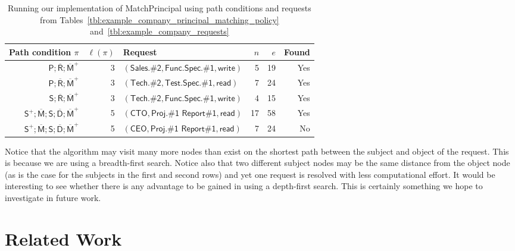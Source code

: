 \documentclass{article}
\newcommand{\comp}{\mathbin{;}}
\begin{document}
\begin{table*}[!ht]\centering
  {\renewcommand{\arraystretch}{1.25}
  \begin{tabular}{|r|r|l|r|r|r|}
    \hline
        \bf Path condition $\pi$ & $\ell(\pi)$ & \bf Request & $n$ & $e$ & \bf Found\\
    \hline
    \hline
        $\textsf{P} \comp \overline{\textsf{R}} \comp \overline{\textsf{M}}^+$ & 3 & $(\textsf{Sales.\#2}, \textsf{Func.Spec.\#1}, \textsf{write})$ & 5 & 19 & Yes\\
        $\textsf{P} \comp \overline{\textsf{R}} \comp \overline{\textsf{M}}^+$ & 3 & $(\textsf{Tech.\#2}, \textsf{Test.Spec.\#1}, \textsf{read})$ & 7 & 24 & Yes\\
        $\textsf{S} \comp \overline{\textsf{R}} \comp \overline{\textsf{M}}^+$  & 3 & $(\textsf{Tech.\#2}, \textsf{Func.Spec.\#1}, \textsf{write})$ & 4 & 15 & Yes\\
        $\textsf{S}^+ \comp \overline{\textsf{M}} \comp \textsf{S} \comp \overline{\textsf{D}} \comp \overline{\textsf{M}}^+$ & 5 & $(\textsf{CTO}, \textsf{Proj.\#1 Report\#1}, \textsf{read})$ & 17 & 58 & Yes\\
        $\textsf{S}^+ \comp \overline{\textsf{M}} \comp \textsf{S} \comp \overline{\textsf{D}} \comp \overline{\textsf{M}}^+$ & 5 & $(\textsf{CEO}, \textsf{Proj.\#1 Report\#1}, \textsf{read})$ & 7 & 24 & No\\
    \hline
  \end{tabular}}
\caption{Running our implementation of \textsf{MatchPrincipal} using path conditions and requests from Tables~\ref{tbl:example_company_principal_matching_policy} and~\ref{tbl:example_company_requests}}\label{tbl:implementation_metrics}
\end{table*}

Notice that the algorithm may visit many more nodes than exist on the shortest path between the subject and object of the request.
This is because we are using a breadth-first search.
Notice also that two different subject nodes may be the same distance from the object node (as is the case for the subjects in the first and second rows) and yet one request is resolved with less computational effort.
It would be interesting to see whether there is any advantage to be gained in using a depth-first search.
This is certainly something we hope to investigate in future work.


\section{Related Work}\label{sec:RelatedWork}
\end{document}
